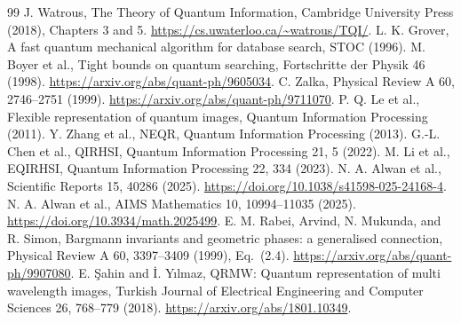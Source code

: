 \documentclass[11pt,a4paper]{article}
\begin{document}

\clearpage
\begin{thebibliography}{99}
 J. Watrous, The Theory of Quantum Information,
Cambridge University Press (2018), Chapters 3 and 5.
\url{https://cs.uwaterloo.ca/~watrous/TQI/}.
 L. K. Grover, A fast quantum mechanical algorithm for database search, STOC (1996).
 M. Boyer et al., Tight bounds on quantum searching,
Fortschritte der Physik 46 (1998). \url{https://arxiv.org/abs/quant-ph/9605034}.
 C. Zalka, Physical Review A 60, 2746--2751 (1999).
\url{https://arxiv.org/abs/quant-ph/9711070}.
 P. Q. Le et al., Flexible representation of quantum images,
Quantum Information Processing (2011).
 Y. Zhang et al., NEQR, Quantum Information Processing (2013).
 G.-L. Chen et al., QIRHSI, Quantum Information Processing 21, 5 (2022).
 M. Li et al., EQIRHSI, Quantum Information Processing 22, 334 (2023).
 N. A. Alwan et al., Scientific Reports 15, 40286 (2025).
\url{https://doi.org/10.1038/s41598-025-24168-4}.
 N. A. Alwan et al., AIMS Mathematics 10, 10994--11035 (2025).
\url{https://doi.org/10.3934/math.2025499}.
 E. M. Rabei, Arvind, N. Mukunda, and R. Simon,
Bargmann invariants and geometric phases: a generalised connection,
Physical Review A 60, 3397--3409 (1999), Eq.~(2.4).
\url{https://arxiv.org/abs/quant-ph/9907080}.
 E. \c{S}ahin and \.{I}. Y{\i}lmaz,
QRMW: Quantum representation of multi wavelength images,
Turkish Journal of Electrical Engineering and Computer Sciences 26,
768--779 (2018). \url{https://arxiv.org/abs/1801.10349}.
\end{thebibliography}
\end{document}
